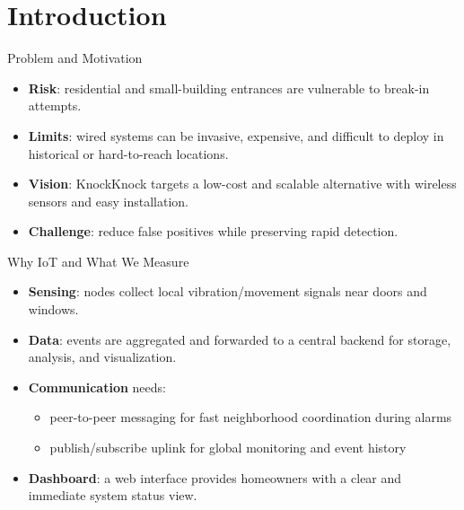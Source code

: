 \section{Introduction}

\begin{frame}{Problem and Motivation}
\begin{itemize}
\item \textbf{Risk}: residential and small-building entrances are vulnerable to break-in attempts.
\item \textbf{Limits}: wired systems can be invasive, expensive, and difficult to deploy in historical or hard-to-reach locations.
\item \textbf{Vision}: KnockKnock targets a low-cost and scalable alternative with wireless sensors and easy installation.
\item \textbf{Challenge}: reduce false positives while preserving rapid detection.
\end{itemize}
\end{frame}

\begin{frame}{Why IoT and What We Measure}
\begin{itemize}
\item \textbf{Sensing}: nodes collect local vibration/movement signals near doors and windows.
\item \textbf{Data}: events are aggregated and forwarded to a central backend for storage, analysis, and visualization.
\item \textbf{Communication} needs:
      \begin{itemize}
      \item peer-to-peer messaging for fast neighborhood coordination during alarms
      \item publish/subscribe uplink for global monitoring and event history
      \end{itemize}
\item \textbf{Dashboard}: a web interface provides homeowners with a clear and immediate system status view.
\end{itemize}
\end{frame}
